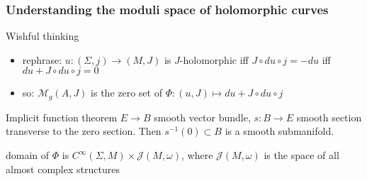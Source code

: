 \begin{frame}
  \frametitle{Understanding the moduli space of holomorphic curves}
  \begin{block}{Wishful thinking}
  \end{block}
  \begin{itemize}
    \item rephrase: $u\colon (\Sigma,j)\to (M,J)$ is $J$-holomorphic iff $J\circ du\circ j=-du$ iff $du+J\circ du\circ j=0$
    \item so: $\mathcal{M}_g(A,J)$ is the zero set of $\Phi\colon(u,J)\mapsto du+J\circ du\circ j$
  \end{itemize}
  \pause
  \begin{block}{ Implicit function theorem}
    $E\to B$ smooth vector bundle, $s\colon B\to E$ smooth section transverse to the zero section. Then $s^{-1}(0)\subset B$ is a smooth submanifold.
  \end{block}
  domain of $\Phi$ is $C^\infty(\Sigma,M)\times\mathcal{J}(M,\omega)$,
  where $\mathcal{J}(M,\omega)$ is the space of all  almost complex structures
\end{frame}

